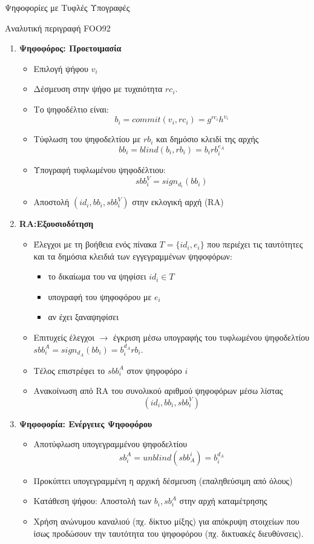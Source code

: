 \documentclass[handout]{beamer}
\begin{document}
\begin{section}{Ψηφοφορίες με Τυφλές Υπογραφές}
\begin{frame}[allowframebreaks]{Αναλυτική περιγραφή FOO92}

\begin{enumerate}
\item \textbf{Ψηφοφόρος: Προετοιμασία}
\begin{itemize}
\item Επιλογή ψήφου $v_i$
\item Δέσμευση στην ψήφο με τυχαιότητα $rc_i$. 
\item Το ψηφοδέλτιο είναι: $$b_i = commit(v_i, rc_i) = g^{rc_i} h^{v_i}$$
\item Τύφλωση του ψηφοδελτίου με $rb_i$ και δημόσιο κλειδί της αρχής  $$ bb_i = blind(b_i,rb_i) = b_i rb_{i}^{e_A} $$
\item Υπογραφή τυφλωμένου ψηφοδέλτιου: $$sbb_i^V = sign_{d_i}(bb_i)$$
\item Αποστολή $(id_i,bb_i,sbb_i^V)$ στην εκλογική αρχή (RA)
\end{itemize}

\framebreak

\item \textbf{RA:Εξουσιοδότηση}
\begin{itemize}
\item Έλεγχοι με τη βοήθεια ενός πίνακα $T = \{ id_i, e_i\}$ που περιέχει τις ταυτότητες και τα δημόσια κλειδιά των εγγεγραμμένων ψηφοφόρων:
\begin{itemize}
    \item το δικαίωμα του να ψηφίσει $id_i \in T$
    \item υπογραφή του ψηφοφόρου με $e_i$
    \item αν έχει ξαναψηφίσει
\end{itemize}  
\item Επιτυχείς έλεγχοι $\rightarrow$ έγκριση μέσω υπογραφής του τυφλωμένου ψηφοδελτίου $sbb_i^A = sign_{d_A}(bb_i) = b_i^{d_A} rb_{i}$.
\item Τέλος επιστρέφει το $sbb_i^A$ στον ψηφοφόρο $i$
\item Ανακοίνωση από RA του συνολικού αριθμού ψηφοφόρων μέσω λίστας $$(id_i,bb_i,sbb_i^V)$$
\end{itemize}

\framebreak

\item \textbf{Ψηφοφορία: Ενέργειες Ψηφοφόρου}
\begin{itemize}
\item Αποτύφλωση υπογεγραμμένου ψηφοδελτίου $$sb_i^A = unblind(sbb^i_A)=b_i^{d_A}$$
\item Προκύπτει υπογεγραμμένη η αρχική δέσμευση (επαληθεύσιμη από όλους)
\item Κατάθεση ψήφου: Αποστολή των $b_i,sb_i^A$ στην αρχή καταμέτρησης
\item Χρήση ανώνυμου καναλιού (πχ. δίκτυο μίξης) για απόκρυψη στοιχείων που ίσως προδώσουν την ταυτότητα του ψηφοφόρου (πχ. δικτυακές διευθύνσεις).
\end{itemize}


\end{enumerate}
\end{frame}
\end{section}
\end{document}

